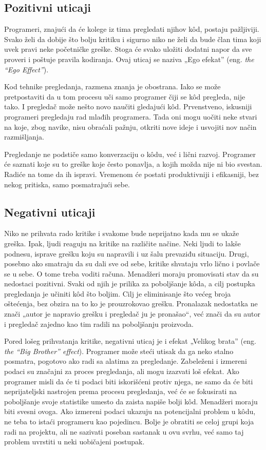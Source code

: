 \documentclass[a4paper]{article}
\begin{document}
\subsection{Pozitivni uticaji}
Programeri, znajući da će kolege iz tima pregledati njihov kôd, postaju pažljiviji. Svako želi da dobije što bolju kritiku i sigurno niko ne želi da bude član tima koji uvek pravi neke početničke greške. Stoga će svako uložiti dodatni napor da sve proveri i poštuje pravila kodiranja. Ovaj uticaj se naziva „Ego efekat” (eng. \emph{the “Ego Effect”}). \cite{bkspcr}

Kod tehnike pregledanja, razmena znanja je obostrana. Iako se može pretpostaviti da u tom procesu uči samo programer čiji se kôd pregleda, nije tako. I pregledač može nešto novo naučiti gledajući kôd. Prvenstveno, iskusniji programeri pregledaju rad mlađih programera. Tada oni mogu uočiti neke stvari na koje, zbog navike, nisu obraćali pažnju, otkriti nove ideje i usvojiti nov način razmišljanja.

Pregledanje ne podstiče samo konverzaciju o kôdu, već i lični razvoj. Programer će saznati koje su to greške koje često ponavlja, a kojih možda nije ni bio svestan. Radiće na tome da ih ispravi. Vremenom će postati produktivniji i efikasniji, bez nekog pritiska, samo posmatrajući sebe. \cite{bkspcr}

\subsection{Negativni uticaji}
Niko ne prihvata rado kritike i svakome bude neprijatno kada mu se ukaže greška. Ipak, ljudi reaguju na kritike na različite načine. Neki ljudi to lakše podnesu, isprave grešku koju su napravili i uz šalu prevaziđu situaciju. Drugi, posebno ako smatraju da su dali sve od sebe, kritike shvataju vrlo lično i povlače se u sebe. O tome treba voditi računa. Menadžeri moraju promovisati stav da su nedostaci pozitivni. Svaki od njih je prilika za poboljšanje kôda, a cilj postupka pregledanja je učiniti kôd što boljim. Cilj je eliminisanje što većeg broja oštećenja, bez obzira na to ko je prouzrokovao grešku. Pronalazak nedostatka ne znači „autor je napravio grešku i pregledač ju je pronašao“, već znači da su autor i pregledač zajedno kao tim radili na poboljšanju proizvoda. \cite{bkspcr} \cite{ibm}

Pored lošeg prihvatanja kritike, negativni uticaj je i efekat „Velikog brata” (eng. \emph{the “Big Brother” effect}). \cite{bkspcr} Programer može steći utisak da ga neko stalno posmatra, pogotovo ako radi sa alatima za pregledanje. Zabeleženi i izmereni podaci su značajni za proces pregledanja, ali mogu izazvati loš efekat. Ako programer misli da će ti podaci biti iskorišćeni protiv njega, ne samo da će biti neprijateljski nastrojen prema procesu pregledanja, već će se fokusirati na poboljšanje svoje statistike umesto da zaista napiše bolji kôd. Menadžeri moraju biti svesni ovoga. Ako izmereni podaci ukazuju na potencijalni problem u kôdu, ne teba to istaći programeru kao pojedincu. Bolje je obratiti se celoj grupi koja radi na projektu, ali ne sazivati poseban sastanak u ovu svrhu, već samo taj problem uvrstiti u neki uobičajeni postupak. \cite{ibm}
\end{document}
